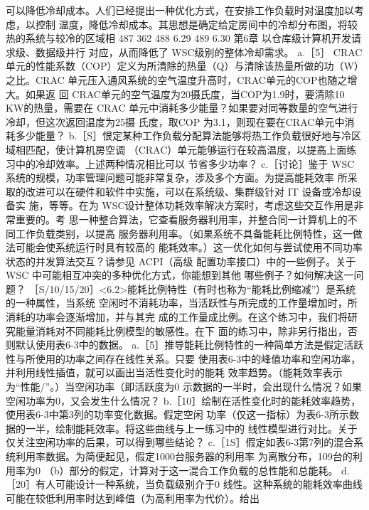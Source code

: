 可以降低冷却成本。人们已经提出一种优化方式，在安排工作负载时对温度加以考虑，以控制
温度，降低冷却成本。其思想是确定给定房间中的冷却分布图，将较热的系统与较冷的区域相
487
362
488
6.29
489
6.30
第6章 以仓库级计算机开发请求级、数据级并行
对应，从而降低了 WSC级别的整体冷却需求。
a.［5］ CRAC单元的性能系数（COP）定义为所清除的热量（Q）与清除该热量所做的功（W）
之比。CRAC 单元压入通风系统的空气温度升高时，CRAC单元的COP也随之增大。如果返
回 CRAC单元的空气温度为20摄氏度，当COP为1.9时，要清除10 KW的热量，需要在
CRAC 单元中消耗多少能量？如果要对同等数量的空气进行冷却，但这次返回温度为25摄
氏度，取COP 为3.1，则现在要在CRAC单元中消耗多少能量？
b.［S］恨定某种工作负载分配算法能够将热工作负载很好地与冷区域相匹配，使计算机房空调
（CRAC）单元能够运行在较高温度，以提高上面练习中的冷却效率。上述两种情况相比可以
节省多少功率？
c.［讨论］鉴于 WSC 系统的规模，功率管理问题可能非常复杂，涉及多个方面。为提高能耗效率
所采取的改进可以在硬件和软件中实施，可以在系统级、集群级针对 IT 设备或冷却设备实
施，等等。在为 WSC设计整体功耗效率解决方案时，考虑这些交互作用是非常重要的。考
思一种整合算法，它查看服务器利用率，并整合同一计算机上的不同工作负载类别，以提高
服务器利用率。（如果系统不具备能耗比例特性，这一做法可能会使系统运行时具有较高的
能耗效率。）这一优化如何与尝试使用不同功率状态的并发算法交互？请参见 ACPI（高级
配置功率接口）中的一些例子。关于 WSC 中可能相互冲突的多种优化方式，你能想到其他
哪些例子？如何解决这一问题？
［S/10/15/20］<6.2>能耗比例特性（有时也称为“能耗比例缩减”）是系统的一种属性，当系统
空闲时不消耗功率，当活跃性与所完成的工作量增加时，所消耗的功率会逐渐增加，并与其完
成的工作量成比例。在这个练习中，我们将研究能量消耗对不同能耗比例模型的敏感性。在下
面的练习中，除非另行指出，否则默认使用表6-3中的数据。
a.［5］推导能耗比例特性的一种简单方法是假定活跃性与所使用的功率之间存在线性关系。只要
使用表6-3中的峰值功率和空闲功率，并利用线性插值，就可以画出当活性变化时的能耗
效率趋势。（能耗效率表示为“性能/”。）当空闲功率（即活跃度为0%
示数据的一半时，会出现什么情况？如果空闲功率为0，又会发生什么情况？
b.［10］绘制在活性变化时的能耗效率趋势，使用表6-3中第3列的功率变化数据。假定空闲
功率（仅这一指标）为表6-3所示数据的一半，绘制能耗效率。将这些曲线与上一练习中的
线性模型进行对比。关于仅关注空闲功率的后果，可以得到哪些结论？
c.［1S］假定如表6-3第7列的混合系统利用率数据。为简便起见，假定1000台服务器的利用率
为离散分布，109台的利用率为0%
（b）部分的假定，计算对于这一混合工作负载的总性能和总能耗。
d. ［20］有人可能设计一种系统，当负载级别介于0%
线性。这种系统的能耗效率曲线可能在较低利用率时达到峰值（为高利用率为代价）。给出
